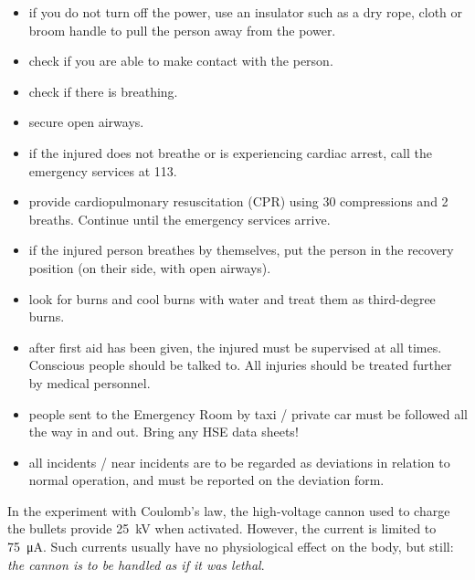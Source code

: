 \documentclass[../Elmag-labhefte-2020.tex]{subfiles}
\begin{document}
\begin{enumerate}
\begin{itemize}
        \item if you do not turn off the power, use an insulator such as a dry rope, cloth or broom handle to pull the person away from the power.
        \item check if you are able to make contact with the person.
        \item check if there is breathing.
        \item secure open airways.
        \item if the injured does not breathe or is experiencing cardiac arrest, call the emergency services at 113.
        \item provide cardiopulmonary resuscitation (CPR) using 30 compressions and 2 breaths. Continue until the emergency services arrive.
        \item if the injured person breathes by themselves, put the person in the recovery position (on their side, with open airways).
        \item look for burns and cool burns with water and treat them as third-degree burns.
        \item after first aid has been given, the injured must be supervised at all times. Conscious people should be talked to. All injuries should be treated further by medical personnel.
        \item people sent to the Emergency Room by taxi / private car must be followed all the way in and out. Bring any HSE data sheets!
        \item all incidents / near incidents are to be regarded as deviations in relation to normal operation, and must be reported on the deviation form.
    \end{itemize}
\end{enumerate}

In the experiment with Coulomb's law, the high-voltage cannon used to charge the bullets provide \SI{25}{\kilo\V} when activated. However, the current is limited to \SI{75}{\micro\ampere}. Such currents usually have no physiological effect on the body, but still: \textit{the cannon is to be handled as if it was lethal}.
\end{document}
